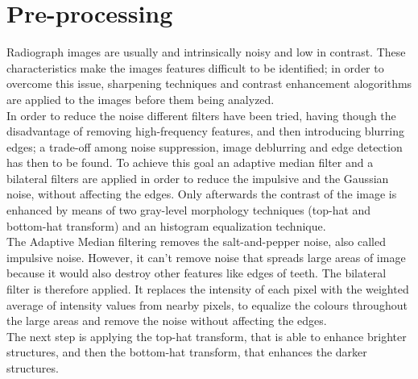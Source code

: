 \documentclass[a4paper]{article}
\begin{document}
\section{Pre-processing}
Radiograph images are usually and intrinsically noisy and low in contrast. These characteristics make the images features difficult to be identified; in order to overcome this issue, sharpening techniques and contrast enhancement alogorithms are applied to the images before them being analyzed. \\
In order to reduce the noise different filters have been tried, having though the disadvantage of removing high-frequency features, and then introducing blurring edges; a trade-off among noise suppression, image deblurring and edge detection has then to be found. To achieve this goal an adaptive median filter and a bilateral filters are applied in order to reduce the impulsive and the Gaussian noise, without affecting the edges. Only afterwards the contrast of the image is enhanced by means of two gray-level morphology techniques (top-hat and bottom-hat transform) and an histogram equalization technique. \\
The Adaptive Median filtering removes the salt-and-pepper noise, also called impulsive noise. However, it can't remove noise that spreads large areas of image because it would also destroy other features like edges of teeth. The bilateral filter is therefore applied. It replaces the intensity of each pixel with the weighted average of intensity values from nearby pixels, to equalize the colours throughout the large areas and remove the noise without affecting the edges. \\
The next step is applying the top-hat transform, that is able to enhance brighter structures, and then the bottom-hat transform, that enhances the darker structures. \\ 
\end{document}
